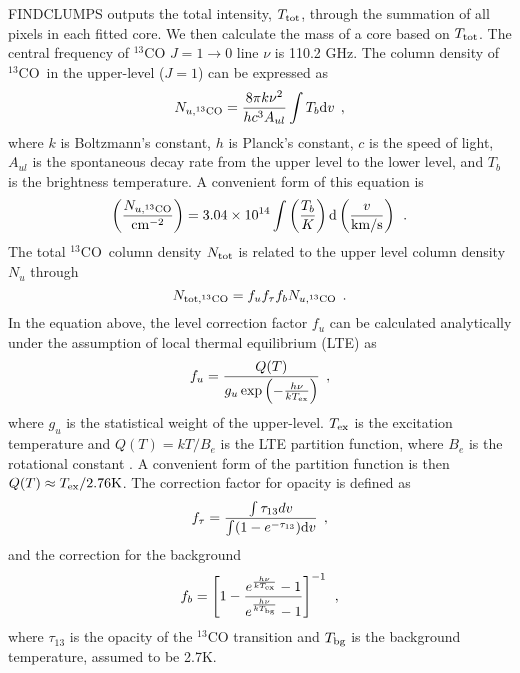 \documentclass[12pt,preprint]{aastex}
\def\13co{$^{13}$CO}
\def\lp{\>\> .}
\def\lc{\>\> ,}
\begin{document}
FINDCLUMPS  outputs the total  intensity, $T_{\rm tot}$, through
the summation of all pixels in each fitted core. We then calculate the
mass of a core based on $T_{\rm tot}$. The central frequency of
$^{13}$CO $J=1\to 0$ line $\nu$ is 110.2 GHz. The column density of \13co\ in the
upper-level ($J=1$) can be expressed as~\citep{RadioTool}
\begin{equation}
N_{u,^{13}\rm CO}=\frac{8\pi k\nu^2}{hc^3 A_{ul}}\int T_b {\rm d}v
\lc
\end{equation}
where $k$ is Boltzmann's constant, $h$ is Planck's constant, $c$ is the speed of light, $A_{ul}$
is the spontaneous  decay rate from the upper level to the lower level, and $T_b$ is the brightness temperature.
A convenient form of this equation is
\begin{equation}
\left(\frac{N_{u,^{13}\rm CO}}{\rm cm^{-2}}\right)=3.04\times 10^{14}\int \left(\frac{T_b}{K}\right) {\rm d}\left(\frac{v}{\rm km/s}\right) \lp
\end{equation}
The total \13co\ column
density $N_{\rm tot}$ is related to the upper level column density
$N_{u}$ through \citep{Di_Li_Thesis}
\begin{equation}
N_{\rm tot, ^{13}CO}=f_{u} f_{\tau} f_b N_{u,\rm ^{13}CO} \lp
\end{equation}
In the equation above, the level correction factor $f_u$ can be
calculated analytically under the assumption of local thermal
equilibrium (LTE) as
\begin{equation}
f_{u}=\frac{Q(T)}{g_u \exp\left(-\frac{h\nu}{kT_{\rm ex}}\right)} \lc
\end{equation}
where $g_u$ is the statistical weight of the upper-level. $T_{\rm
ex}$ is the excitation temperature and $Q(T)=kT/B_e$ is the LTE
partition function, where $B_e$ is the rotational constant
\citep{Astrospec}. A convenient form of
the partition function is then $Q(T)\approx T_{\rm ex}/2.76\rm K$.
The correction factor for opacity is defined as
\begin{equation}
f_{\tau}=\frac{\int\tau_{13}dv}{\int(1-e^{-\tau_{13}}){\rm d}v} \lc
\end{equation}
and the correction for the background
\begin{equation}
f_b=\left[1-\frac{e^{\frac{h\nu}{kT_{\rm
ex}}}-1}{e^{\frac{h\nu}{kT_{\rm bg}}}-1}\right]^{-1} \lc
\end{equation}
where $\tau_{13}$ is the opacity of the $^{13}$CO transition and
$T_{\rm bg}$ is the background temperature, assumed to be 2.7K.
\end{document}

